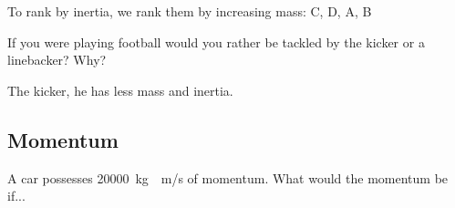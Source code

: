 \documentclass[answers]{exam}
\begin{document}
\begin{questions}
\begin{solution}
    To rank by inertia, we rank them by increasing mass: C, D, A, B
\end{solution}

\question
If you were playing football would you rather be tackled by the kicker or a linebacker? Why?

\begin{solution}
    The kicker, he has less mass and inertia.
\end{solution}

\clearpage
\begin{EnvUplevel}
    \subsection{Momentum}
\end{EnvUplevel}

\question

A car possesses \SI[group-separator={,}]{20000}{kg\cdot m/s} of momentum. What would the momentum be if...




\end{questions}
\end{document}
